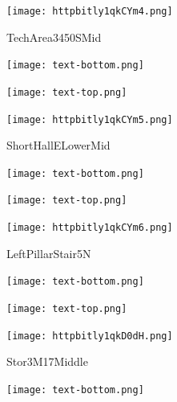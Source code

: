 \documentclass[letterpaper]{article}
\begin{document}
 \begingroup 
 \centerline{\texttt{[image: httpbitly1qkCYm4.png]}} 
 \endgroup 
 \vspace*{\fill} 

 \hfill{\small TechArea3450SMid} 

  \vspace{0.7in} 
 
 \centerline{\texttt{[image: text-bottom.png]}} 
 
 \pagebreak 
{} 
 \vspace*{\fill} 
 
  \centerline{\texttt{[image: text-top.png]}} 
 
 \vspace{0.5in} 
 
 \begingroup 
 \centerline{\texttt{[image: httpbitly1qkCYm5.png]}} 
 \endgroup 
 \vspace*{\fill} 

 \hfill{\small ShortHallELowerMid} 

  \vspace{0.7in} 
 
 \centerline{\texttt{[image: text-bottom.png]}} 
 
 \pagebreak 
{} 
 \vspace*{\fill} 
 
  \centerline{\texttt{[image: text-top.png]}} 
 
 \vspace{0.5in} 
 
 \begingroup 
 \centerline{\texttt{[image: httpbitly1qkCYm6.png]}} 
 \endgroup 
 \vspace*{\fill} 

 \hfill{\small LeftPillarStair5N} 

  \vspace{0.7in} 
 
 \centerline{\texttt{[image: text-bottom.png]}} 
 
 \pagebreak 
{} 
 \vspace*{\fill} 
 
  \centerline{\texttt{[image: text-top.png]}} 
 
 \vspace{0.5in} 
 
 \begingroup 
 \centerline{\texttt{[image: httpbitly1qkD0dH.png]}} 
 \endgroup 
 \vspace*{\fill} 

 \hfill{\small Stor3M17Middle} 

  \vspace{0.7in} 
 
 \centerline{\texttt{[image: text-bottom.png]}} 
 
 \pagebreak 
\end{document}
